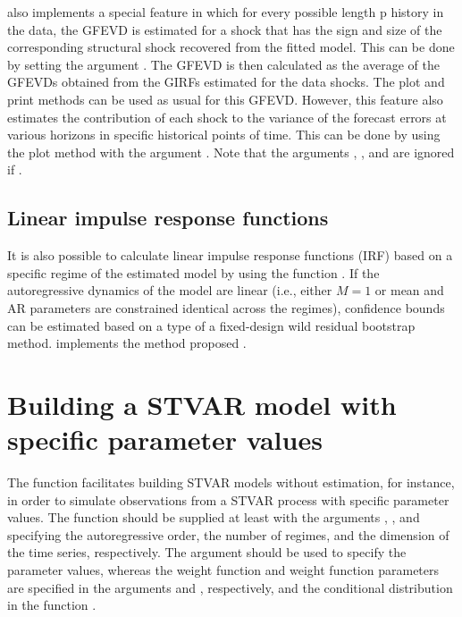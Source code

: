 \documentclass[nojss]{jss}
\begin{document}
 also implements a special feature in which for every possible length p history in the data, the GFEVD is estimated for a shock that has the sign and size of the corresponding structural shock recovered from the fitted model. This can be done by setting the argument . The GFEVD is then calculated as the average of the GFEVDs obtained from the GIRFs estimated for the data shocks. The plot and print methods can be used as usual for this GFEVD. However, this feature also estimates the contribution of each shock to the variance of the forecast errors at various horizons in specific historical points of time. This can be done by using the plot method with the argument . Note that the arguments , , and  are ignored if .

\subsection{Linear impulse response functions}

It is also possible to calculate linear impulse response functions (IRF) based on a specific regime of the estimated model by using the function . If the autoregressive dynamics of the model are linear (i.e., either $M=1$ or mean and AR parameters are constrained identical across the regimes), confidence bounds can be estimated based on a type of a fixed-design wild residual bootstrap method.  implements the method proposed \cite{Herwartz+Lutkepohl:2014}.


\section{Building a STVAR model with specific parameter values}\label{sec:STVAR}

The function  facilitates building STVAR models without estimation, for instance, in order to simulate observations from a STVAR process with specific parameter values. The function should be supplied at least with the arguments , , and  specifying the autoregressive order, the number of regimes, and the dimension of the time series, respectively. The argument  should be used to specify the parameter values, whereas the weight function and weight function parameters are specified in the arguments  and , respectively, and the conditional distribution in the function .
\end{document}
